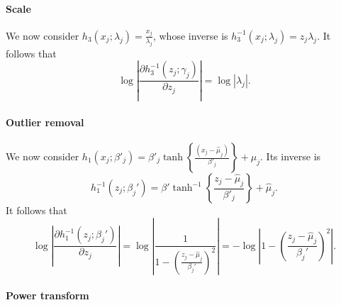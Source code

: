 \documentclass{statsmsc}
\begin{document}
{\paragraph{Scale}%
\label{par:Scale}

We now consider $h_3(x_j;\lambda_j)=\frac{x_j}{\lambda_j}$, whose inverse is $h_3^{-1}(x_j;\lambda_j)={z_j}{\lambda_j}$. It follows that
\begin{equation}
    \log \left|\frac{\partial h_3^{-1}(z_j ; \gamma_j)}{\partial z_j} \right|
    = \log \left|{\lambda_j}  \right|.
\end{equation}

\paragraph{Outlier removal}%
\label{par:Outlier removal}

We now consider $h_1(x_j;\beta'_j)= \beta'_j \tanh\left\{\frac{(x_j - \hat{\mu}_j)}{\beta'_j}  \right\} + \hat{\mu}_j$. Its inverse is
\begin{equation}
    h_1^{-1}(z_j;\beta_j') =\beta' \tanh^{-1} \left\{\frac{z_j - \hat{\mu}_j}{\beta'_j}  \right\}
    +\hat{\mu}_j.
\end{equation}
It follows that
\begin{equation}
    \log \left|\frac{\partial h_1^{-1}(z_j ; \beta_j')}{\partial z_j} \right|
    = \log \left| \frac{1}{1-\left( \frac{z_j-\hat{\mu}_j}{\beta_j'}  \right)^2}  \right|
    = -\log\left| 1-\left( \frac{z_j-\hat{\mu}_j}{\beta_j'}  \right)^2 \right|.
\end{equation}

\paragraph{Power transform}%
\label{par:Power transform}

}
\end{document}
